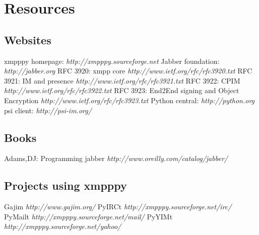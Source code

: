 \chapter{Resources}


\section{Websites}
xmpppy homepage:		\textit{http://xmpppy.sourceforge.net}
\newline
Jabber foundation:		\textit{http://jabber.org}
\newline
\newline
RFC 3920: xmpp core		\textit{http://www.ietf.org/rfc/rfc3920.txt}
\newline
RFC 3921: IM and presence	\textit{http://www.ietf.org/rfc/rfc3921.txt}
\newline
RFC 3922: CPIM			\textit{http://www.ietf.org/rfc/rfc3922.txt}
\newline
RFC 3923: End2End signing and Object Encryption	\textit{http://www.ietf.org/rfc/rfc3923.txt}
\newline
\newline
Python central:			\textit{http://python.org}
\newline
psi client:			\textit{http://psi-im.org/}

\section{Books}
Adams,DJ: Programming jabber	\textit{http://www.oreilly.com/catalog/jabber/}

\section{Projects using xmpppy}
Gajim			\textit{http://www.gajim.org/}
PyIRCt			\textit{http://xmpppy.sourceforge.net/irc/}
PyMailt			\textit{http://xmpppy.sourceforge.net/mail/}
PyYIMt			\textit{http://xmpppy.sourceforge.net/yahoo/}